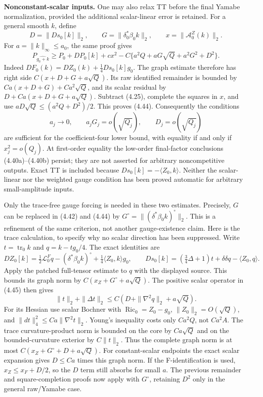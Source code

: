 \documentclass[
  11pt,
]{article}
\begin{document}
\textbf{Nonconstant-scalar inputs.} One may also relax TT before the
final Yamabe normalization, provided the additional scalar-linear error
is retained. For a general smooth \(k\), define \[
 D=\|Ds_0[k]\|_2,\qquad
 G=\|\delta_0^*\beta_0k\|_2,\qquad
 x=\|\mathcal A_0^Z(k)\|_2.
\] For \(a=\|k\|_\infty\le a_0\), the same proof gives \[
 \boxed{P_{\widehat{g_0+k}}\ge P_0+DP_0[k]+c x^2
       -C\{a^2Q+aG\sqrt Q+a^2G^2+D^2\}.} \tag{4.44}
\] Indeed \(DF_0(k)=DZ_0(k)+\frac14Ds_0[k]g_0\). The graph estimate
therefore has right side \(C(x+D+G+a\sqrt Q)\). Its raw identified
remainder is bounded by \(Ca(x+D+G)+Ca^2\sqrt Q\), and its scalar
residual by \(D+Ca(x+D+G+a\sqrt Q)\). Subtract (4.25), complete the
squares in \(x\), and use \(aD\sqrt Q\le(a^2Q+D^2)/2\). This proves
(4.44). Consequently the conditions \[
 a_j\to0,\qquad a_jG_j=o(\sqrt{Q_j}),\qquad
 D_j=o(\sqrt{Q_j})
\] are sufficient for the coefficient-four lower bound, with equality if
and only if \(x_j^2=o(Q_j)\). At first-order equality the low-order
final-factor conclusions (4.40a)--(4.40b) persist; they are not asserted
for arbitrary noncompetitive outputs. Exact TT is included because
\(Ds_0[k]=-\langle Z_0,k\rangle\). Neither the scalar-linear nor the
weighted gauge condition has been proved automatic for arbitrary
small-amplitude inputs.

Only the trace-free gauge forcing is needed in these two estimates.
Precisely, \(G\) can be replaced in (4.42) and (4.44) by
\(G^\circ=\|(\delta^*\beta_0k)^\circ\|_2\). This is a refinement of the
same criterion, not another gauge-existence claim. Here is the trace
calculation, to specify why no scalar direction has been suppressed.
Write \(t=\operatorname{tr}_0k\) and \(q=k-tg_0/4\). The exact
identities are \[
 DZ_0[k]=\tfrac12\mathcal L_0^Fq-(\delta^*\beta_0k)^\circ
                     +\tfrac14\langle Z_0,k\rangle g_0,
 \qquad
 Ds_0[k]=(\tfrac34\Delta+1)t+\delta\delta q-\langle Z_0,q\rangle.
 \tag{4.45}
\] Apply the patched full-tensor estimate to \(q\) with the displayed
source. This bounds its graph norm by \(C(x_Z+G^\circ+a\sqrt Q)\). The
positive scalar operator in (4.45) then gives \[
 \|t\|_2+\|\Delta t\|_2
       \le C(D+\|\nabla^2q\|_2+a\sqrt Q).
\] For its Hessian use scalar Bochner with
\(\operatorname{Ric}_0=Z_0-g_0\), \(\|Z_0\|_2=O(\sqrt Q)\), and
\(\|dt\|_4^2\le Ca\|\nabla^2t\|_2\). Young's inequality costs only
\(Ca^2Q\), not \(Ca^2A\). The trace curvature-product norm is bounded on
the core by \(Ca\sqrt Q\) and on the bounded-curvature exterior by
\(C\|t\|_2\). Thus the complete graph norm is at most
\(C(x_Z+G^\circ+D+a\sqrt Q)\). For constant-scalar endpoints the exact
scalar expansion gives \(D\le Ca\) times this graph norm. If the
F-identification is used, \(x_Z\le x_F+D/2\), so the \(D\) term still
absorbs for small \(a\). The previous remainder and square-completion
proofs now apply with \(G^\circ\), retaining \(D^2\) only in the general
raw/Yamabe case.
\end{document}
